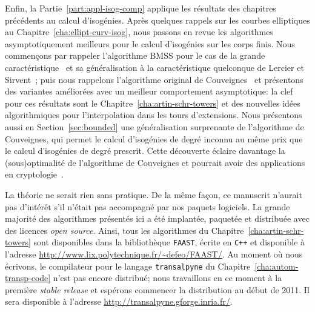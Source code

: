 Enfin, la Partie~\ref{part:appl-isog-comp} applique les résultats des
chapitres précédents au calcul d'isogénies. Après quelques rappels sur
les courbes elliptiques au Chapitre~\ref{cha:ellipt-curv-isog}, nous
passons en revue les algorithmes asymptotiquement meilleurs pour le
calcul d'isogénies sur les corps finis. Nous commençons par rappeler
l'algorithme BMSS pour le cas de la grande
caractéristique~\cite{bostan+morain+salvy+schost08} et sa
généralisation à la caractéristique quelconque de Lercier et
Sirvent~\cite{lercier+sirvent08}; puis nous rappelons l'algorithme
original de Couveignes~\cite{couveignes96} et présentons des variantes
améliorées avec un meilleur comportement asymptotique: la clef pour
ces résultats sont le Chapitre~\ref{cha:artin-schr-towers} et des
nouvelles idées algorithmiques pour l'interpolation dans les tours
d'extensions. Nous présentons aussi en Section~\ref{sec:bounded} une
généralisation surprenante de l'algorithme de Couveignes, qui permet
le calcul d'isogénies de degré inconnu au même prix que le calcul
d'isogénies de degré prescrit. Cette découverte éclaire davantage la
(sous)optimalité de l'algorithme de Couveignes et pourrait avoir des
applications en
cryptologie~\cite{gaudry+hess+smart02,GHS,hess03,teske06}.

La théorie ne serait rien sans pratique. De la même façon, ce
manuscrit n'aurait pas d'intérêt s'il n'était pas accompagné par nos
paquets logiciels. La grande majorité des algorithmes présentés ici a
été implantée, paquetée et distribuée avec des licences \emph{open
  source}. Ainsi, tous les algorithmes du
Chapitre~\ref{cha:artin-schr-towers} sont disponibles dans la
bibliothèque \texttt{FAAST}, écrite en \texttt{C++} et disponible à
l'adresse \url{http://www.lix.polytechnique.fr/~defeo/FAAST/}.  Au
moment où nous écrivons, le compilateur pour le langage
\texttt{transalpyne} du Chapitre~\ref{cha:autom-transp-code} n'est pas
encore distribué; nous travaillons en ce moment à la première
\emph{stable release} et espérons commencer la distribution au début
de 2011. Il sera disponible à l'adresse
\url{ http://transalpyne.gforge.inria.fr/}.




